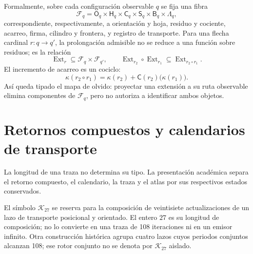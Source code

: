 Formalmente, sobre cada configuración observable \(q\) se fija una fibra
\[
 \mathcal F_q=
 \mathsf O_q\times\mathsf H_q\times\mathsf C_q\times
 \mathsf S_q\times\mathsf B_q\times\mathsf\Lambda_q,
\]
correspondiente, respectivamente, a orientación y hoja, residuo y cociente,
acarreo, firma, cilindro y frontera, y registro de transporte. Para una
flecha cardinal \(r:q\to q'\), la prolongación admisible no se reduce a una
función sobre residuos; es la relación
\[
 \operatorname{Ext}_r\subseteq\mathcal F_q\times\mathcal F_{q'},
 \qquad
 \operatorname{Ext}_{r_2}\circ\operatorname{Ext}_{r_1}
 \subseteq\operatorname{Ext}_{r_2\circ r_1}.
\]
El incremento de acarreo es un cociclo:
\[
 \kappa(r_2\circ r_1)
 =\kappa(r_2)+\mathsf C(r_2)\bigl(\kappa(r_1)\bigr).
\]
Así queda tipado el mapa de olvido: proyectar una extensión a su ruta
observable elimina componentes de \(\mathcal F_q\), pero no autoriza a
identificar ambos objetos.

\section{Retornos compuestos y calendarios de transporte}

La longitud de una traza no determina su tipo. La presentación académica
separa el retorno compuesto, el calendario, la traza y el atlas por sus
respectivos estados conservados.

El s\'imbolo \(\mathcal K_{27}\) se reserva para la composici\'on de
veintisiete actualizaciones de un lazo de transporte posicional y orientado.
El entero \(27\) es su longitud de composici\'on; no lo convierte en una
traza de 108 iteraciones ni en un emisor infinito. Otra construcci\'on hist\'orica
agrupa cuatro lazos cuyos periodos conjuntos alcanzan 108; ese rotor conjunto
no se denota por \(\mathcal K_{27}\) aislado.


